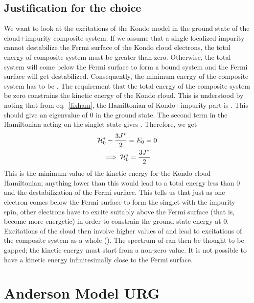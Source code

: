 \documentclass[14pt]{extarticle}
\numberwithin{equation}{section}
\begin{document}
{\subsection*{Justification for the choice }
We want to look at the excitations of the Kondo model in the ground state of the cloud+impurity composite system.
If we assume that a single localized impurity cannot destabilize the Fermi surface of the Kondo cloud electrons, the total energy of composite system must be greater than zero.
Otherwise, the total system will come below the Fermi surface to form a bound system and the Fermi surface will get destabilized.
Consequently, the minimum energy of the composite system has to be .
\pb
The requirement that the total energy of the composite system be zero constrains the kinetic energy of the Kondo cloud.
This is understood by noting that from eq.~\ref{fixham}, the Hamiltonian of Kondo+impurity part is .
This should give an eigenvalue of 0 in the ground state.
The second term in the Hamiltonian acting on the singlet state gives .
Therefore, we get
\begin{gather}
\mathcal{H}_0^* -\frac{3J^*}{2} = E_0 = 0 \\
\implies \mathcal{H}_0^s = \frac{3J^*}{2}
\end{gather}
This is the minimum value of the kinetic energy for the Kondo cloud Hamiltonian; anything lower than this would lead to a total energy  less than 0 and the destabilization of the Fermi surface.
This tells us that just as one electron comes below the Fermi surface to form the singlet with the impurity spin, other electrons have to excite suitably above the Fermi surface (that is, become more energetic) in order to constrain the ground state energy at 0.
Excitations of the cloud then involve higher values of  and lead to excitations of the composite system as a whole ().
The spectrum of  can then be thought to be gapped; the kinetic energy must start from a non-zero value.
It is not possible to have a kinetic energy infinitesimally close to the Fermi surface.
}

\section{Anderson Model URG}\label{section4}
\end{document}
